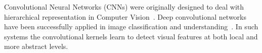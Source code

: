 
Convolutional Neural Networks (CNNs) were originally designed to deal
with hierarchical representation in Computer
Vision~\cite{lecun1995convolutional}. Deep convolutional networks have
been successfully applied in image classification and
understanding~\cite{karen2014vgg,kaiming2015resnet}. In such systems
the convolutional kernels learn to detect visual features at both
local and more abstract levels.






